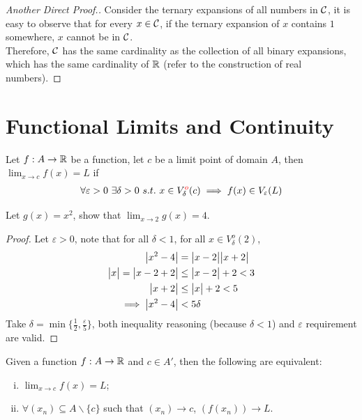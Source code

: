 \documentclass[11pt]{article}
\begin{document}
	\begin{proof}[Another Direct Proof.]
		Consider the ternary expansions of all numbers in $\mathcal{{C}}$, it is easy to observe that for every $x \in \mathcal{{C}}$, if the ternary expansion of $x$ contains $1$ somewhere, $x$ cannot be in $\mathcal{{C}}$. \\
		Therefore, $\mathcal{{C}}$ has the same cardinality as the collection of all binary expansions, which has the same cardinality of $\mathbb{R}$ (refer to the construction of real numbers).
	\end{proof}
	
	\section{Functional Limits and Continuity}
	\begin{definition}
		Let $f: A \to \mathbb{R}$ be a function, let $c$ be a limit point of domain $A$, then $\lim_{x \to c} f(x) = L$ if 
		\begin{align}
			\forall \varepsilon > 0\ \exists \delta > 0\ s.t.\ x \in V_\delta^{\textcolor{red}{o}} (c) \implies f(x) \in V_\varepsilon(L)
		\end{align}
	\end{definition}
	
	\begin{example}
		Let $g(x) = x^2$, show that $\lim_{x \to 2} g(x) = 4$.
		\begin{proof}
			Let $\varepsilon > 0$, note that for all $\delta < 1$, for all $x \in V_\delta^o(2)$,
			\begin{align}
				\big \vert {x^2 - 4} \big \vert &= \big \vert {x-2} \big \vert \big \vert {x+2} \big \vert \\
				\big \vert {x} \big \vert = \big \vert {x-2+2} \big \vert &\leq \big \vert {x-2} \big \vert + 2 < 3 \\
				\big \vert {x+2} \big \vert &\leq \big \vert {x} \big \vert + 2 < 5 \\
				\implies \big \vert {x^2-4} \big \vert &< 5 \delta
			\end{align}
			Take $\delta = \min\{\frac{1}{2}, \frac{\varepsilon}{5}\}$, both inequality reasoning (because $\delta < 1$) and $\varepsilon$ requirement are valid.
		\end{proof}
	\end{example}
	
	\begin{theorem}
		Given a function $f: A \to \mathbb{R}$ and $c \in A'$, then the following are equivalent:
		\begin{enumerate}[(i)]
			\item $\lim_{x \to c} f(x) = L$;
			\item $\forall (x_n) \subseteq A \backslash \{c\}$ such that $(x_n) \to c$, $(f(x_n)) \to L$.
		\end{enumerate}
	\end{theorem}
	
\end{document}
